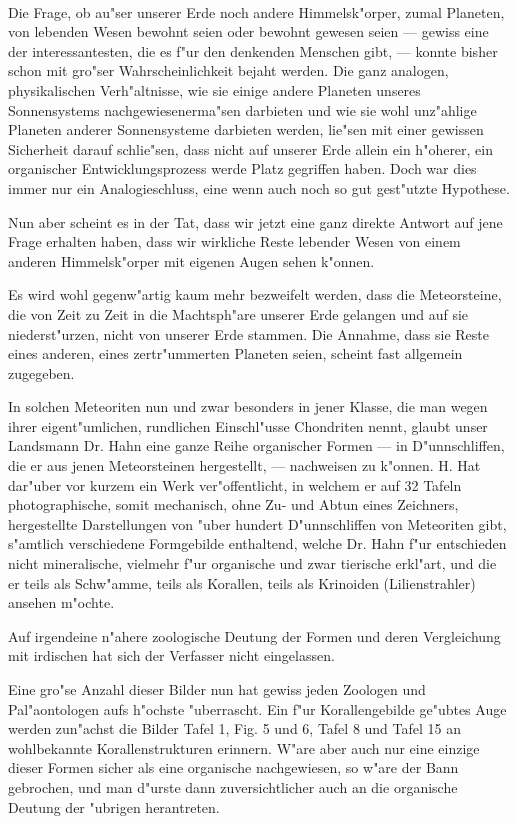 \documentclass[a4paper, 12pt, oneside]{article}
\begin{document}
\paragraph{}
Die Frage, ob au"ser unserer Erde noch andere Himmelsk"orper, zumal Planeten, von lebenden Wesen bewohnt seien oder bewohnt gewesen seien — gewiss eine der interessantesten, die es f"ur den denkenden Menschen gibt, — konnte bisher schon mit gro"ser Wahrscheinlichkeit bejaht werden. Die ganz analogen, physikalischen Verh"altnisse, wie sie einige andere Planeten unseres Sonnensystems nachgewiesenerma"sen darbieten und wie sie wohl unz"ahlige Planeten anderer Sonnensysteme darbieten werden, lie"sen mit einer gewissen Sicherheit darauf schlie"sen, dass nicht auf unserer Erde allein ein h"oherer, ein organischer Entwicklungsprozess werde Platz gegriffen haben. Doch war dies immer nur ein Analogieschluss, eine wenn auch noch so gut gest"utzte Hypothese.

Nun aber scheint es in der Tat, dass wir jetzt eine ganz direkte Antwort auf jene Frage erhalten haben, dass wir wirkliche Reste lebender Wesen von einem anderen Himmelsk"orper mit eigenen Augen sehen k"onnen.

Es wird wohl gegenw"artig kaum mehr bezweifelt werden, dass die Meteorsteine, die von Zeit zu Zeit in die Machtsph"are unserer Erde gelangen und auf sie niederst"urzen, nicht von unserer Erde stammen. Die Annahme, dass sie Reste eines anderen, eines zertr"ummerten Planeten seien, scheint fast allgemein zugegeben.

In solchen Meteoriten nun und zwar besonders in jener Klasse, die man wegen ihrer eigent"umlichen, rundlichen Einschl"usse Chondriten nennt, glaubt unser Landsmann Dr. Hahn eine ganze Reihe organischer Formen — in D"unnschliffen, die er aus jenen Meteorsteinen hergestellt, — nachweisen zu k"onnen. H. Hat dar"uber vor kurzem ein Werk ver"offentlicht, in welchem er auf 32 Tafeln photographische, somit mechanisch, ohne Zu- und Abtun eines Zeichners, hergestellte Darstellungen von "uber hundert D"unnschliffen von Meteoriten gibt, s"amtlich verschiedene Formgebilde enthaltend, welche Dr. Hahn f"ur entschieden nicht mineralische, vielmehr f"ur organische und zwar tierische erkl"art, und die er teils als Schw"amme, teils als Korallen, teils als Krinoiden (Lilienstrahler) ansehen m"ochte.

Auf irgendeine n"ahere zoologische Deutung der Formen und deren Vergleichung mit irdischen hat sich der Verfasser nicht eingelassen.

Eine gro"se Anzahl dieser Bilder nun hat gewiss jeden Zoologen und Pal"aontologen aufs h"ochste "uberrascht. Ein f"ur Korallengebilde ge"ubtes Auge werden zun"achst die Bilder Tafel 1, Fig. 5 und 6, Tafel 8 und Tafel 15 an wohlbekannte Korallenstrukturen erinnern. W"are aber auch nur eine einzige dieser Formen sicher als eine organische nachgewiesen, so w"are der Bann gebrochen, und man d"urste dann zuversichtlicher auch an die organische Deutung der "ubrigen herantreten.
\end{document}
